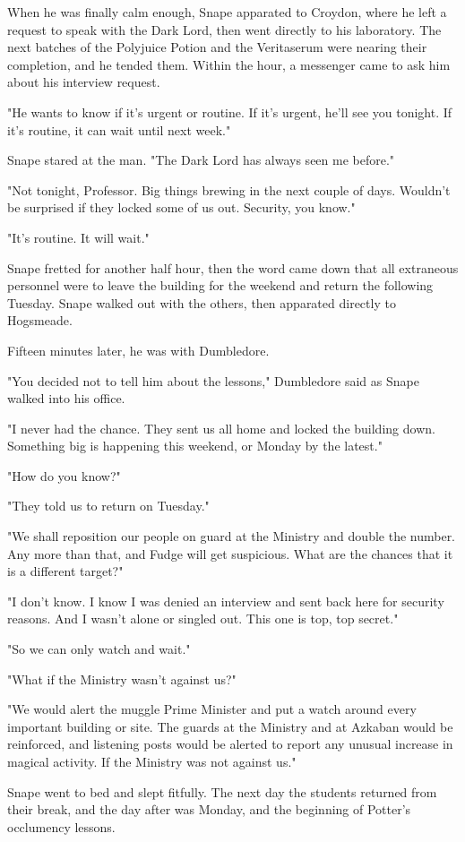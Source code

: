 When he was finally calm enough, Snape apparated to Croydon, where he left a request to speak with the Dark Lord, then went directly to his laboratory. The next batches of the Polyjuice Potion and the Veritaserum were nearing their completion, and he tended them. Within the hour, a messenger came to ask him about his interview request.

"He wants to know if it's urgent or routine. If it's urgent, he'll see you tonight. If it's routine, it can wait until next week."

Snape stared at the man. "The Dark Lord has always seen me before."

"Not tonight, Professor. Big things brewing in the next couple of days. Wouldn't be surprised if they locked some of us out. Security, you know."

"It's routine. It will wait."

Snape fretted for another half hour, then the word came down that all extraneous personnel were to leave the building for the weekend and return the following Tuesday. Snape walked out with the others, then apparated directly to Hogsmeade.

Fifteen minutes later, he was with Dumbledore.

"You decided not to tell him about the lessons," Dumbledore said as Snape walked into his office.

"I never had the chance. They sent us all home and locked the building down. Something big is happening this weekend, or Monday by the latest."

"How do you know?"

"They told us to return on Tuesday."

"We shall reposition our people on guard at the Ministry and double the number. Any more than that, and Fudge will get suspicious. What are the chances that it is a different target?"

"I don't know. I know I was denied an interview and sent back here for security reasons. And I wasn't alone or singled out. This one is top, top secret."

"So we can only watch and wait."

"What if the Ministry wasn't against us?"

"We would alert the muggle Prime Minister and put a watch around every important building or site. The guards at the Ministry and at Azkaban would be reinforced, and listening posts would be alerted to report any unusual increase in magical activity. If the Ministry was not against us."

Snape went to bed and slept fitfully. The next day the students returned from their break, and the day after was Monday, and the beginning of Potter's occlumency lessons.


